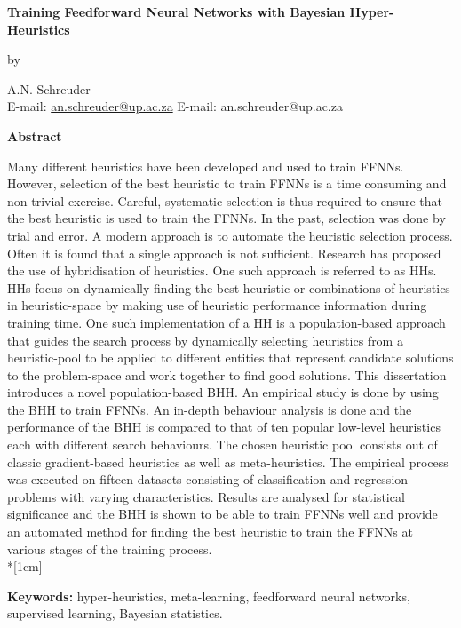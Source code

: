 \pagestyle{empty}

\begin{center}
    \Large
    \textbf{Training Feedforward Neural Networks with Bayesian Hyper-Heuristics}
    \vspace{0.5cm}

    \normalsize
    by
    \vspace{0.5cm}

    \normalsize
    A.N. Schreuder\\
    \ifpdf
        E-mail: \href{mailto:an.schreuder@up.ac.za}{an.schreuder@up.ac.za}
    \else
        E-mail: an.schreuder@up.ac.za
    \fi
    \vspace{1cm}

    \Large
    \textbf{Abstract}
\end{center}

Many different heuristics have been developed and used to train \acfp{FFNN}.  However, selection of the best heuristic to train
\acsp{FFNN} is a time consuming and non-trivial exercise. Careful, systematic
selection is thus required to ensure that the best heuristic is used to train the \acsp{FFNN}. In the past, selection
was done by trial and error. A modern approach is to automate the heuristic selection
process. Often it is found that a single approach is not sufficient. Research has
proposed the use of hybridisation of heuristics. One such approach is referred to
as \acfp{HH}. \acsp{HH} focus on dynamically finding the best heuristic or combinations of heuristics in
heuristic-space by making use of heuristic performance information during training time. One such
implementation of a \acs{HH} is a population-based approach that guides the search process by
dynamically selecting heuristics from a heuristic-pool to be applied to
different entities that represent candidate solutions to the problem-space and
work together to find good solutions. This dissertation introduces a novel population-based \Acf{BHH}. An empirical study is done by
using the \acs{BHH} to train \acsp{FFNN}. An in-depth behaviour analysis is done and the performance of the \acs{BHH} is compared to that of ten popular low-level heuristics each with different search
behaviours. The chosen heuristic pool consists out of classic gradient-based heuristics as well as meta-heuristics. The empirical process was executed on fifteen datasets consisting of classification and regression problems
with varying characteristics. Results are analysed for statistical significance and the \acs{BHH} is shown to be able to train \acsp{FFNN} well and provide an automated method for finding the best heuristic to train the \acsp{FFNN} at various stages of the training process.\\*[1cm]
\noindent
\parbox{\textwidth}{
    \textbf{Keywords:} hyper-heuristics, meta-learning, feedforward neural
    networks, supervised learning, Bayesian statistics.
}
\vfill
\newpage

